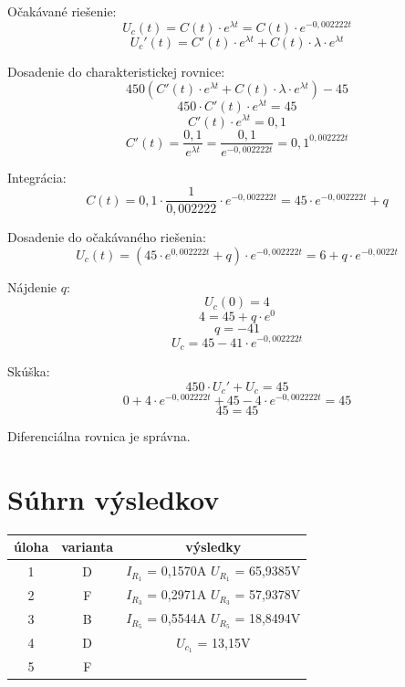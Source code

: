 \documentclass[a4paper,11pt,titlepage]{article}
\begin{document}
\vspace{5mm}

Očakávané riešenie:
\[U_c(t) = C(t) \cdot e^{\lambda t} = C(t) \cdot e^{-0,002222t}\]
\[U_c'(t) = C'(t) \cdot e^{\lambda t} + C(t) \cdot \lambda \cdot e^{\lambda t}\]

\vspace{5mm}

Dosadenie do charakteristickej rovnice:
\[450(C'(t) \cdot e^{\lambda t} + C(t) \cdot \lambda \cdot e^{\lambda t}) - 45\]
\[450 \cdot C'(t) \cdot e^{\lambda t} = 45\]
\[C'(t) \cdot e^{\lambda t} = 0,1\]
\[C'(t) = \frac{0,1}{e^{\lambda t}} = \frac{0,1}{e^{-0,002222t}} = 0,1^{0,002222t}\]

\vspace{5mm}

Integrácia:
\[C(t) = 0,1 \cdot \frac{1}{0,002222} \cdot e^{-0,002222t} = 45 \cdot e^{-0,002222t} + q\]

\vspace{5mm}

Dosadenie do očakávaného riešenia:
\[U_c(t) = (45 \cdot e^{0,002222t} + q) \cdot e^{-0,002222t} = 6 + q \cdot e^{-0,0022t}\]

\vspace{5mm}

Nájdenie $q$:
\[U_c(0) = 4\]
\[4 = 45 + q \cdot e^0\]
\[q = -41\]
\[U_c = 45 - 41 \cdot e^{-0,002222t}\]

\vspace{5mm}

Skúška:
\[450 \cdot U_c' + U_c = 45\]
\[0 + 4 \cdot e^{-0,002222t} + 45 - 4 \cdot e^{-0,002222t} = 45\]
\[45 = 45\]

Diferenciálna rovnica je správna.

\newpage

\section{Súhrn výsledkov}

\begin{tabular}{ |c|c|c| } \hline
    úloha & varianta & výsledky \\ \hline
    1 & D & $I_{R_1}$ = 0,1570A \quad $U_{R_1}$ = 65,9385V \\ \hline
    2 & F & $I_{R_3}$ = 0,2971A \quad $U_{R_3}$ = 57,9378V\\ \hline
    3 & B & $I_{R_5}$ = 0,5544A \quad $U_{R_5}$ = 18,8494V\\ \hline
    4 & D & $U_{c_1}$ = 13,15V \\ \hline
    5 & F & \\ \hline
\end{tabular}
\end{document}
